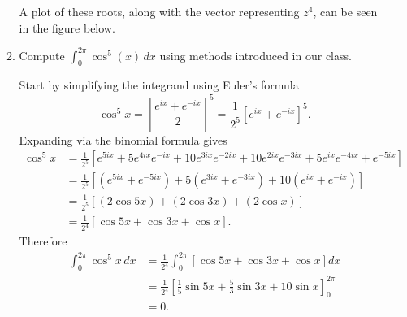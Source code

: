 \documentclass[11pt]{article}
\begin{document}
\begin{enumerate}
\begin{enumerate}
\begin{mdframed}[align=left]
    A plot of these roots, along with the vector representing $z^4$, can be seen in the figure below.

    \begin{center}
    \end{center}
  \end{mdframed}
  
  \item Compute ${\displaystyle \int_0^{2\pi}} \cos^5(x)\,dx$ using methods introduced in our class.
  
  \begin{mdframed}
    Start by simplifying the integrand using Euler's formula
    \begin{equation*}
      \cos^5 x = \left[\frac{e^{ix} + e^{-ix}}{2}\right]^5 = \frac{1}{2^5}[e^{ix} + e^{-ix}]^5.
    \end{equation*}
    Expanding via the binomial formula gives
    \begin{align*}
      \cos^5 x &= \frac{1}{2^5}[e^{5ix} + 5e^{4ix}e^{-ix} + 10e^{3ix}e^{-2ix} + 10e^{2ix}e^{-3ix} + 5e^{ix}e^{-4ix} + e^{-5ix}] \\
      &= \frac{1}{2^5}[(e^{5ix} + e^{-5ix}) + 5(e^{3ix} + e^{-3ix}) + 10(e^{ix} + e^{-ix})] \\
      &= \frac{1}{2^5}[(2\cos 5x) + (2\cos 3x) + (2\cos x)] \\
      &= \frac{1}{2^4}[\cos 5x + \cos 3x + \cos x].
    \end{align*}
    Therefore
    \begin{align*}
      \int_0^{2\pi}\cos^5 x\, dx &= \frac{1}{2^4}\int_0^{2\pi}\left[\cos 5x + \cos 3x + \cos x\right]dx \\
      &= \frac{1}{2^4}\left[\frac{1}{5}\sin 5x + \frac{5}{3}\sin 3x + 10\sin x\right]_0^{2\pi} \\
      &= 0.
    \end{align*}
  \end{mdframed}


\end{enumerate}
\end{enumerate}
\end{document}
